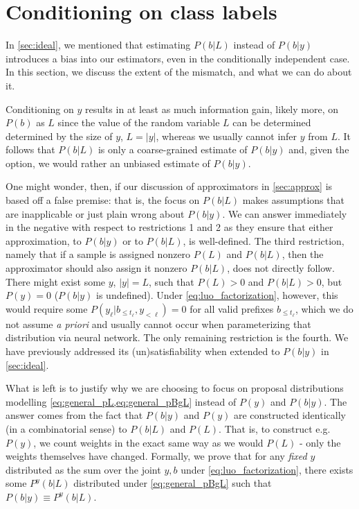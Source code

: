 \documentclass{article}
\begin{document}
\section{Conditioning on class labels} \label{sec:class_labels}

In \cref{sec:ideal}, we mentioned that estimating $P(b|L)$ instead of $P(b|y)$
introduces a bias into our estimators, even in the conditionally independent
case. In this section, we discuss the extent of the mismatch, and what we can
do about it.

Conditioning on $y$ results in at least as much information gain, likely more,
on $P(b)$ as $L$ since the value of the random variable $L$ can be determined
determined by the size of $y$, $L = |y|$, whereas we usually cannot infer $y$
from $L$. It follows that $P(b|L)$ is only a coarse-grained estimate of
$P(b|y)$ and, given the option, we would rather an unbiased estimate of
$P(b|y)$.

One might wonder, then, if our discussion of approximators in \cref{sec:approx}
is based off a false premise: that is, the focus on $P(b|L)$ makes assumptions
that are inapplicable or just plain wrong about $P(b|y)$. We can answer
immediately in the negative with respect to restrictions 1 and 2 as they
ensure that either approximation, to $P(b|y)$ or to $P(b|L)$, is well-defined.
The third restriction, namely that if a sample is assigned nonzero $P(L)$ and
$P(b|L)$, then the approximator should also assign it nonzero $P(b|L)$, does
not directly follow. There might exist some $y$, $|y| = L$, such that
$P(L) > 0$ and $P(b|L) > 0$, but $P(y) = 0$ ($P(b|y)$ is undefined).
Under \cref{eq:luo_factorization}, however, this would require some
$P(y_{\ell}|b_{\leq t_\ell}, y_{< \ell}) = 0$ for all valid prefixes
$b_{\leq t_\ell}$, which we do not assume \textit{a priori} and usually cannot
occur when parameterizing that distribution via neural network. The only
remaining restriction is the fourth. We have previously addressed its
(un)satisfiability when extended to $P(b|y)$ in \cref{sec:ideal}.

What is left is to justify why we are choosing to focus on proposal
distributions modelling \cref{eq:general_pL,eq:general_pBgL} instead of $P(y)$
and $P(b|y)$. The answer comes from the fact that $P(b|y)$ and $P(y)$ are
constructed identically (in a combinatorial sense) to $P(b|L)$ and $P(L)$. That
is, to construct e.g. $P(y)$, we count weights in the exact same way as we
would $P(L)$ - only the weights themselves have changed. Formally, we prove
that for any \emph{fixed} $y$ distributed as the sum over the joint $y,b$ under
\cref{eq:luo_factorization}, there exists some $P^y(b|L)$ distributed under
\cref{eq:general_pBgL} such that $P(b|y) \equiv P^y(b|L)$.
\end{document}

